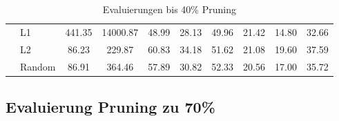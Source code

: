 \begin{table}[h]
{\begin{tabular}{l l | c c | c c c c c | r}
			                             & L1              & 441.35             & 14000.87
			                             & 48.99           & 28.13              & 49.96
			                             & 21.42           & 14.80              & 32.66            \\


			                             & L2              & 86.23              & 229.87
			                             & 60.83           & 34.18              & 51.62
			                             & 21.08           & 19.60              & 37.59            \\


			                             & Random          & 86.91              & 364.46
			                             & 57.89           & 30.82              & 52.33
			                             & 20.56           & 17.00              & 35.72            \\
			\midrule
		\end{tabular}}
	\caption{Evaluierungen bis 40\% Pruning}
	\label{tab:pruning40}
\end{table}

\newpage

\subsection{Evaluierung Pruning zu 70\%}


